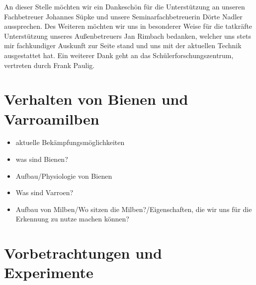 \documentclass[11pt,a4paper]{article}
\begin{document}
An dieser Stelle möchten wir ein Dankeschön für die Unterstützung an unseren Fachbetreuer Johannes Süpke und unsere Seminarfachbetreuerin Dörte Nadler aussprechen. Des Weiteren möchten wir uns in besonderer Weise für die tatkräfte Unterstützung unseres Außenbetreuers Jan Rimbach bedanken, welcher uns stets mir fachkundiger Auskunft zur Seite stand und uns mit der aktuellen Technik ausgestattet hat. Ein weiterer Dank geht an das Schülerforschungszentrum, vertreten durch Frank Paulig. \\




\newpage
\section{Verhalten von Bienen und Varroamilben}
\begin{itemize}
	\item aktuelle Bekämpfungsmöglichkeiten
	\item was sind Bienen?
	\item Aufbau/Physiologie von Bienen
	\item Was sind Varroen?
	\item Aufbau von Milben/Wo sitzen die Milben?/Eigenschaften, die wir uns für die Erkennung zu nutze machen können?
\end{itemize}

\newpage
\section{Vorbetrachtungen und Experimente} \label{section:Vorbetrachtungen}

\end{document}
